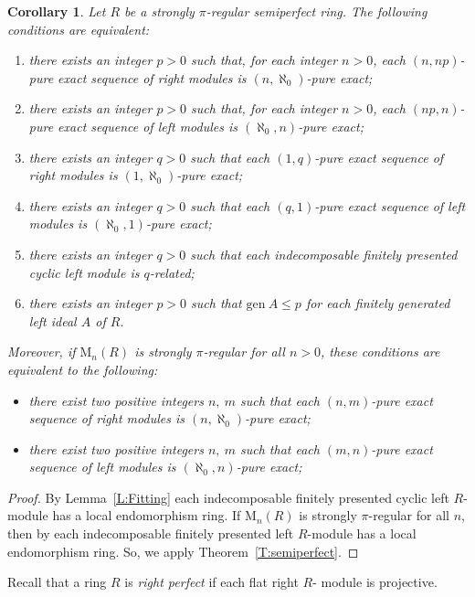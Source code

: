 \documentclass{amsart}
\newtheorem{corollary}[theorem]{Corollary}
\begin{document}
\begin{corollary}
\label{C:semiperfect} Let $R$ be a strongly $\pi$-regular semiperfect ring. The following conditions are equivalent:
\begin{enumerate}
\item there exists an  integer $p>0$ such that, for each  integer $n>0$, each $(n,np)$-pure exact sequence of right modules is $(n,\aleph_0)$-pure exact;
\item there exists an  integer $p>0$ such that, for each  integer $n>0$, each $(np,n)$-pure exact sequence of left modules is $(\aleph_0,n)$-pure exact;
\item there exists an  integer $q>0$ such that each $(1,q)$-pure exact sequence of right modules is $(1,\aleph_0)$-pure exact;
\item there exists an  integer $q>0$ such that each $(q,1)$-pure exact sequence of left modules is $(\aleph_0,1)$-pure exact;
\item there exists an integer $q>0$ such that each indecomposable finitely presented cyclic left module is $q$-related;
\item there exists an integer $p>0$ such that $\mathrm{gen}\ A\leq p$ for each finitely generated left ideal $A$ of $R$.
\end{enumerate}
Moreover, if $\mathrm{M}_n(R)$ is strongly $\pi$-regular for all $n>0$, these conditions are equivalent to the following:
\begin{itemize}
\item[(7)] there exist two positive integers $n,\ m$ such that each $(n,m)$-pure exact sequence of right modules is $(n,\aleph_0)$-pure exact;
\item [(8)] there exist two positive integers $n,\ m$ such that  each $(m,n)$-pure exact sequence of left modules is $(\aleph_0,n)$-pure exact;
\end{itemize}
\end{corollary}
\begin{proof}
 By Lemma~\ref{L:Fitting} each indecomposable finitely presented cyclic left $R$-module has a local endomorphism ring.
If  $\mathrm{M}_n(R)$ is strongly $\pi$-regular for all $n$, then by \cite[Lemmas 3.21 and 2.21]{Fac98} each indecomposable finitely presented left $R$-module has a local endomorphism ring. So, we apply Theorem~\ref{T:semiperfect}.
\end{proof}

Recall that a ring $R$ is {\it right perfect} if each flat right $R$- module is projective.
\end{document}
